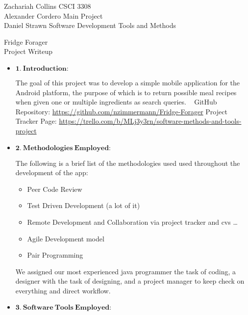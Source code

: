 \documentclass[a4paper,11pt]{article}
\begin{document}
\noindent
Zachariah Collins	\hfill CSCI 3308 \\
Alexander Cordero	\hfill Main Project \\
Daniel Strawn		\hfill Software Development Tools and Methods \\

\begin{center}
\LARGE
Fridge Forager
\\
\Large
Project Writeup
\end{center}

\begin{itemize}
\large
\item $\mathbf{1.\ Introduction:}$

\parindent 30pt
The goal of this project was to develop a simple mobile application for the Android platform, the purpose of which is to return possible meal recipes when given one or multiple ingredients as search queries.
\
\newline
\newline
GitHub Repository:
\newline
\url{https://github.com/nzimmermann/Fridge-Forager}
\newline
\newline
Project Tracker Page:
\newline
\url{https://trello.com/b/MLj3y3rn/software-methods-and-tools-project}
\newline

\item $\mathbf{2.\ Methodologies\ Employed:}$

\parindent 30pt
The following is a brief list of the methodologies used used throughout the development of the app:

\begin{itemize}
\item Peer Code Review
\item Test Driven Development (a lot of it)
\item Remote Development and Collaboration via project tracker and cvs \ldots
\item Agile Development model
\item Pair Programming
\end{itemize}
We assigned our most experienced java programmer the task of coding, a designer with the task of designing, and a project manager to keep check on everything and direct workflow.

\newpage
\item $\mathbf{3.\ Software\ Tools\ Employed:}$


\end{itemize}
\end{document}
